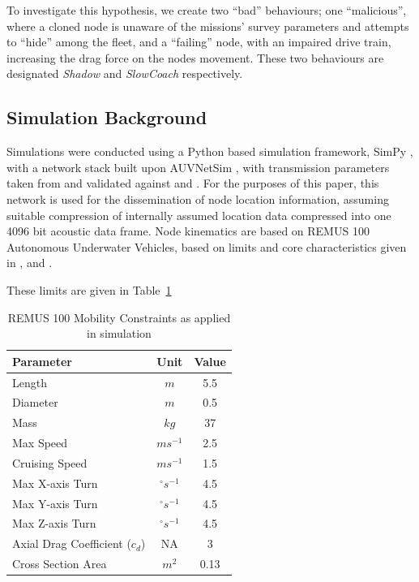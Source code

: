 \documentclass[conference]{IEEEtran}
\begin{document}
To investigate this hypothesis, we create two ``bad'' behaviours; one ``malicious'', where a cloned node is unaware of the missions' survey parameters and attempts to ``hide'' among the fleet, and a ``failing'' node, with an impaired drive train, increasing the drag force on the nodes movement.
These two behaviours are designated \emph{Shadow} and \emph{SlowCoach} respectively.

\subsection{Simulation Background}

Simulations were conducted using a Python based simulation framework, SimPy \cite{Mueller2003SimPy}, with a network stack built upon AUVNetSim \cite{Miquel2008}, with transmission parameters taken from and validated against \cite{Stojanovic2007} and \cite{Stefanov2011}.
For the purposes of this paper, this network is used for the dissemination of node location information, assuming suitable compression of internally assumed location data compressed into one 4096 bit acoustic data frame.
Node kinematics are based on REMUS 100 Autonomous Underwater Vehicles, based on limits and core characteristics given in \cite{Mcewen2001}, \cite{Milgram2001} and \cite{Samad2011}.

These limits are given in Table~\ref{tab:mobility_sysconstraints}
\begin{table}[h]
  \caption{REMUS 100 Mobility Constraints as applied in simulation} \label{tab:mobility_sysconstraints}
  \begin{center}
    \setlength{\tabcolsep}{8pt}
    \begin{tabular}{lcc}
      \toprule
      Parameter & Unit & Value \\
      \midrule
      Length & $m$ & 5.5\\
      Diameter & $m$ & 0.5\\
      Mass & $kg$ & 37 \\ 
      Max Speed & $ms^{-1}$ & 2.5\\
      Cruising Speed & $ms^{-1}$ & 1.5\\
      Max X-axis Turn & $^{\circ} s^{-1}$ & 4.5\\
      Max Y-axis Turn & $^{\circ} s^{-1}$ & 4.5\\
      Max Z-axis Turn & $^{\circ} s^{-1}$ & 4.5\\
      Axial Drag Coefficient ($c_d$) & NA & 3\\
      Cross Section Area & $m^2$ & 0.13\\

      \bottomrule
    \end{tabular}
    \setlength{\tabcolsep}{6pt}
  \end{center}
\end{table}
\end{document}
